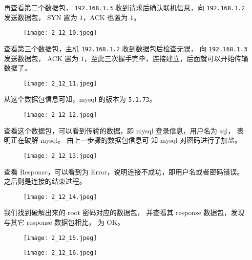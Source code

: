 再查看第二个数据包，
\texttt{192.168.1.3} 收到请求后确认联机信息，向 \texttt{192.168.1.2} 发送数据包，
SYN 置为 $1$，ACK 也置为 $1$。
\begin{figure}[H]
  \begin{center}
    \texttt{[image: 2\_12\_10.jpeg]}
  \end{center}
\end{figure}

查看第三个数据包，主机 \texttt{192.168.1.2} 收到数据包后检查无误，
向 \texttt{192.168.1.3} 发送数据包，
ACK 置为 $1$，至此三次握手完毕，连接建立，后面就可以开始传输数据了。
\begin{figure}[H]
  \begin{center}
    \texttt{[image: 2\_12\_11.jpeg]}
  \end{center}
\end{figure}

从这个数据包信息可知，mysql 的版本为 \texttt{5.1.73}。
\begin{figure}[H]
  \begin{center}
    \texttt{[image: 2\_12\_12.jpeg]}
  \end{center}
\end{figure}

查看这个数据包，可以看到传输的数据，即 mysql 登录信息，用户名为 sql，
表明正在破解 mysql。
由上一步骤的数据包信息可
知 mysql 对密码进行了加盐。
\begin{figure}[H]
  \begin{center}
    \texttt{[image: 2\_12\_13.jpeg]}
  \end{center}
\end{figure}

查看 Response，可以看到为 Error，说明连接不成功，即用户名或者密码错误。
之后则是连接的结束过程。
\begin{figure}[H]
  \begin{center}
    \texttt{[image: 2\_12\_14.jpeg]}
  \end{center}
\end{figure}

我们找到破解出来的 root 密码对应的数据包，
并查看其 response 数据包，发现与其它 response 数据包相比，
为 OK。
\begin{figure}[H]
  \begin{center}
    \texttt{[image: 2\_12\_15.jpeg]}
  \end{center}
\end{figure}
\begin{figure}[H]
  \begin{center}
    \texttt{[image: 2\_12\_16.jpeg]}
  \end{center}
\end{figure}
%
